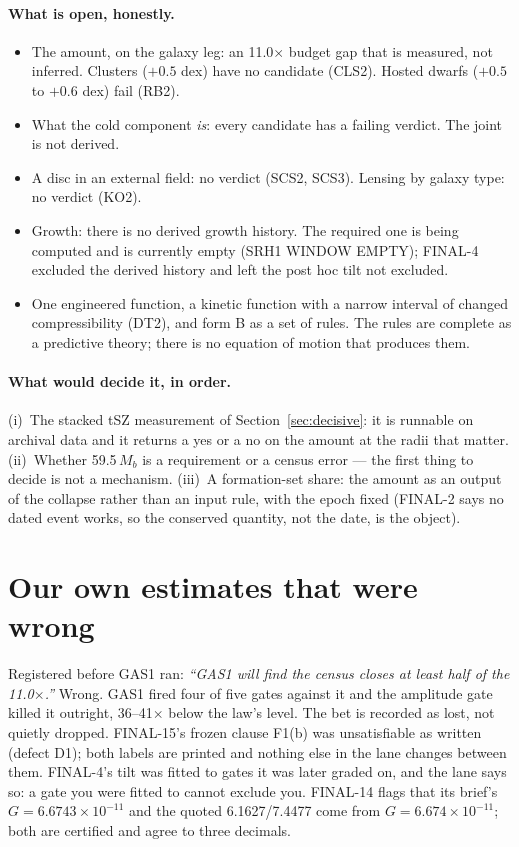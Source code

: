 \documentclass[10pt]{article}
\begin{document}
\paragraph{What is open, honestly.}
\begin{itemize}
\item The amount, on the galaxy leg: an 11.0$\times$ budget gap that is measured, not inferred. Clusters
  ($+0.5$ dex) have no candidate (CLS2). Hosted dwarfs ($+0.5$ to $+0.6$ dex) fail (RB2).
\item What the cold component {\it is}: every candidate has a failing verdict. The joint is not derived.
\item A disc in an external field: no verdict (SCS2, SCS3). Lensing by galaxy type: no verdict (KO2).
\item Growth: there is no derived growth history. The required one is being computed and is currently empty
  (SRH1 WINDOW EMPTY); FINAL-4 excluded the derived history and left the post hoc tilt not excluded.
\item One engineered function, a kinetic function with a narrow interval of changed compressibility (DT2), and
  form B as a set of rules. The rules are complete as a predictive theory; there is no equation of motion that
  produces them.
\end{itemize}

\paragraph{What would decide it, in order.} (i)~The stacked tSZ measurement of Section~\ref{sec:decisive}: it is
runnable on archival data and it returns a yes or a no on the amount at the radii that matter. (ii)~Whether
59.5\,$M_b$ is a requirement or a census error --- the first thing to decide is not a mechanism. (iii)~A
formation-set share: the amount as an output of the collapse rather than an input rule, with the epoch fixed
(FINAL-2 says no dated event works, so the conserved quantity, not the date, is the object).

\section{Our own estimates that were wrong}

Registered before GAS1 ran: {\it ``GAS1 will find the census closes at least half of the 11.0$\times$.''}
Wrong. GAS1 fired four of five gates against it and the amplitude gate killed it outright, 36--41$\times$ below
the law's level. The bet is recorded as lost, not quietly dropped. FINAL-15's frozen clause F1(b) was
unsatisfiable as written (defect D1); both labels are printed and nothing else in the lane changes between
them. FINAL-4's tilt was fitted to gates it was later graded on, and the lane says so: a gate you were fitted to
cannot exclude you. FINAL-14 flags that its brief's $G=6.6743\times10^{-11}$ and the quoted 6.1627/7.4477 come
from $G=6.674\times10^{-11}$; both are certified and agree to three decimals.
\end{document}
